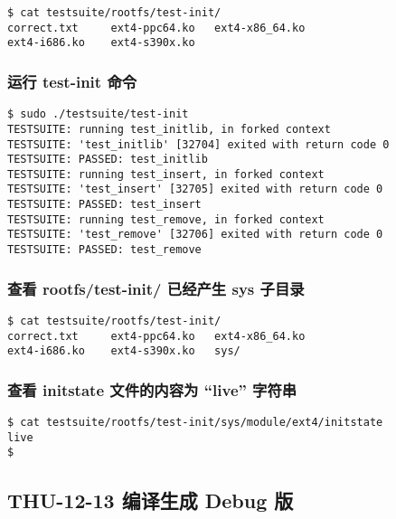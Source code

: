 \documentclass[11pt,a4paper]{article}
\begin{document}
{\begin{shaded}\begin{verbatim}
$ cat testsuite/rootfs/test-init/
correct.txt     ext4-ppc64.ko   ext4-x86_64.ko  
ext4-i686.ko    ext4-s390x.ko   
\end{verbatim}\end{shaded}}
\subsubsection{运行 test-init 命令}

{\begin{shaded}\begin{verbatim}
$ sudo ./testsuite/test-init 
TESTSUITE: running test_initlib, in forked context
TESTSUITE: 'test_initlib' [32704] exited with return code 0
TESTSUITE: PASSED: test_initlib
TESTSUITE: running test_insert, in forked context
TESTSUITE: 'test_insert' [32705] exited with return code 0
TESTSUITE: PASSED: test_insert
TESTSUITE: running test_remove, in forked context
TESTSUITE: 'test_remove' [32706] exited with return code 0
TESTSUITE: PASSED: test_remove
\end{verbatim}\end{shaded}}
\subsubsection{查看 rootfs/test-init/ 已经产生 sys 子目录}

{\begin{shaded}\begin{verbatim}
$ cat testsuite/rootfs/test-init/
correct.txt     ext4-ppc64.ko   ext4-x86_64.ko
ext4-i686.ko    ext4-s390x.ko   sys/
\end{verbatim}\end{shaded}}
\subsubsection{查看 initstate 文件的内容为 ``live'' 字符串}

{\begin{shaded}\begin{verbatim}
$ cat testsuite/rootfs/test-init/sys/module/ext4/initstate 
live
$ 
\end{verbatim}\end{shaded}}
\subsection{THU-12-13 编译生成 Debug 版}
\end{document}
